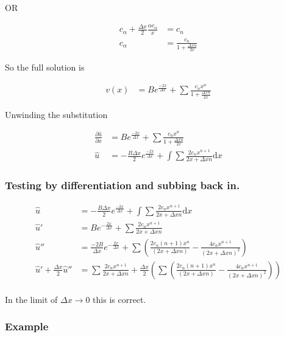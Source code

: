 \documentclass[a4paper]{article}
\begin{document}
OR 

\begin{align*}
c _\alpha + \frac{\Delta x }{2} \frac{\alpha c_\alpha }{x} & = c_n \\
c_\alpha & = \frac{c_n}{1 + \frac{\Delta x \alpha }{2x}}
\end{align*}

So the full solution is 

\begin{align*}
v ( x) & = B e^{\frac{-2 x}{\Delta x} } + \sum \frac{c_n x ^n }{1 + \frac{\Delta x n}{2 x}} 
\end{align*}

Unwinding the substitution 

\begin{align*}
\frac{\partial \hat{u}}{\partial x } & = B e^{\frac{-2 x}{\Delta x} } + \sum \frac{c_n x ^n }{1 + \frac{\Delta x n}{2 x}} \\
\hat{u} & =  - \frac{B \Delta x}{2} e^{\frac{-2 x}{\Delta x} } + \int \sum	 \frac{2 c_n x^{n+1}}{2x + \Delta x n } \mathrm{d} x
\end{align*}

\subsubsection*{Testing by differentiation and subbing back in. }

\begin{align*}
\hat{u} & =  - \frac{B \Delta x}{2} e^{\frac{-2 x}{\Delta x} } + \int \sum	 \frac{2 c_n x^{n+1}}{2x + \Delta x n } \mathrm{d} x \\
\hat{u} ' & = B e ^{- \frac{2x}{\Delta x }} + \sum	 \frac{2 c_n x^{n+1}}{2x + \Delta x n } \\
\hat{u} '' & = \frac{- 2 B }{\Delta x} e ^{- \frac{2x}{\Delta x }} + \sum \left( \frac{2 c_n (n+1) x^n}{(2x + \Delta x n)} - \frac{4 c_n x^{n+1}}{(2 x + \Delta x n )^2}  \right) \\
\hat{u} ' + \frac{\Delta x}{2} \hat{u} '' & = \sum	 \frac{2 c_n x^{n+1}}{2x + \Delta x n } + \frac{\Delta x}{2} \left( \sum \left( \frac{2 c_n (n+1) x^n}{(2x + \Delta x n)} - \frac{4 c_n x^{n+1}}{(2 x + \Delta x n )^2}  \right) \right) \\
\end{align*}

In the limit of $\Delta x \rightarrow 0$ this is correct. 

\subsubsection*{Example}
\end{document}
